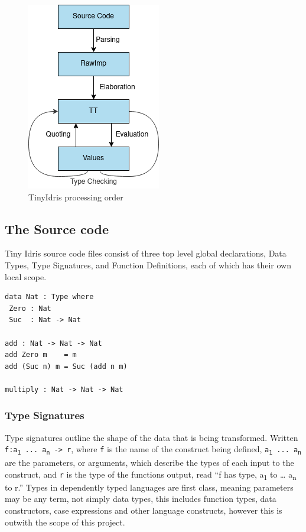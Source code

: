 \documentclass[a4paper]{article}
\begin{document}
\begin{center}
\begin{figure}[htbp]
\centering
\includegraphics[scale=0.65]{./Resource/main.png}
\caption{TinyIdris processing order}
\end{figure}
\end{center}

\clearpage

\subsection{The Source code}
\label{sec:org85decd2}
Tiny Idris source code files consist of three top level global 
declarations, Data Types, Type Signatures, and Function Definitions,
each of which has their own local scope. 

\begin{center}
\begin{verbatim}
data Nat : Type where
 Zero : Nat
 Suc  : Nat -> Nat

add : Nat -> Nat -> Nat
add Zero m    = m
add (Suc n) m = Suc (add n m) 

multiply : Nat -> Nat -> Nat
\end{verbatim}
\end{center}

\subsubsection{Type Signatures}
\label{sec:org6cd40f9}
Type signatures outline the shape of the data that is being transformed.
Written \texttt{f:a\textsubscript{1} ... a\textsubscript{n} -> r}, where \texttt{f} is the name of the construct being defined, \texttt{a\textsubscript{1} ...  a\textsubscript{n}} are
the parameters, or arguments, which describe the types of each input to the construct, and \texttt{r} is the type of the functions output, read ``f has type, a\textsubscript{1} 
to \ldots{} a\textsubscript{n} to r.'' Types in dependently typed languages are first class,
meaning parameters may be any term, not simply data types, this includes function 
types, data constructors, case expressions and other language constructs, however this is outwith the scope of
this project.
\end{document}
